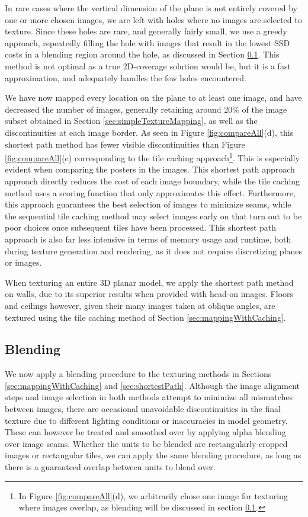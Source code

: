 \documentclass[]{spie}  %
\begin{document}
In rare cases where the vertical dimension of the plane is not
entirely covered by one or more chosen images, we are left with holes
where no images are selected to texture. Since these holes are rare,
and generally fairly small, we use a greedy approach, repeatedly
filling the hole with images that result in the lowest SSD costs in a
blending region around the hole, as discussed in Section
\ref{sec:blending}. This method is not optimal as a true 2D-coverage
solution would be, but it is a fast approximation, and adequately
handles the few holes encountered.

We have now mapped every location on the plane to at least one image,
and have decreased the number of images, generally retaining around
20\% of the image subset obtained in Section
\ref{sec:simpleTextureMapping}, as well as the discontinuities at each
image border. As seen in Figure \ref{fig:compareAll}(d), this shortest
path method has fewer visible discontinuities than Figure
\ref{fig:compareAll}(c) corresponding to the tile caching
approach\footnote{In Figure \ref{fig:compareAll}(d), we arbitrarily
  chose one image for texturing where images overlap, as blending will
  be discussed in section \ref{sec:blending}.}. This is especially
evident when comparing the posters in the images. This shortest path
approach approach directly reduces the cost of each image boundary,
while the tile caching method uses a scoring function that only
approximates this effect. Furthermore, this approach guarantees the
best selection of images to minimize seams, while the sequential tile
caching method may select images early on that turn out to be poor
choices once subsequent tiles have been processed. This shortest path
approach is also far less intensive in terms of memory usage and
runtime, both during texture generation and rendering, as it does not
require discretizing planes or images.

When texturing an entire 3D planar model, we apply the shortest path
method on walls, due to its superior results when provided with
head-on images. Floors and ceilings however, given their many images
taken at oblique angles, are textured using the tile caching method of
Section \ref{sec:mappingWithCaching}.


\subsection{Blending}
\label{sec:blending}
We now apply a blending procedure to the texturing methods in Sections
\ref{sec:mappingWithCaching} and \ref{sec:shortestPath}. Although the
image alignment steps and image selection in both methods attempt to
minimize all mismatches between images, there are occasional
unavoidable discontinuities in the final texture due to different
lighting conditions or inaccuracies in model geometry. These can
however be treated and smoothed over by applying alpha blending over
image seams.  Whether the units to be blended are
rectangularly-cropped images or rectangular tiles, we can apply the
same blending procedure, as long as there is a guaranteed overlap
between units to blend over.
\end{document}
